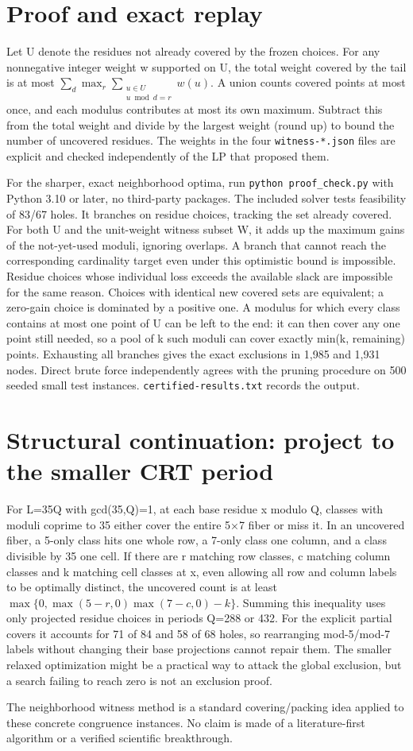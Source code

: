 \documentclass[11pt]{article}
\begin{document}
\section{Proof and exact replay}\label{proof-and-exact-replay}

Let U denote the residues not already covered by the frozen choices. For any nonnegative integer weight w supported on U, the total weight covered by the tail is at most
\(\sum_d \max_r \sum_{\substack{u\in U\\u\bmod d=r}} w(u)\).
A union counts covered points at most once, and each modulus contributes at most its own maximum. Subtract this from the total weight and divide by the largest weight (round up) to bound the number of uncovered residues. The weights in the four \texttt{witness-*.json} files are explicit and checked independently of the LP that proposed them.

For the sharper, exact neighborhood optima, run \texttt{python\ proof\_check.py} with Python 3.10 or later, no third-party packages. The included solver tests feasibility of 83/67 holes. It branches on residue choices, tracking the set already covered. For both U and the unit-weight witness subset W, it adds up the maximum gains of the not-yet-used moduli, ignoring overlaps. A branch that cannot reach the corresponding cardinality target even under this optimistic bound is impossible. Residue choices whose individual loss exceeds the available slack are impossible for the same reason. Choices with identical new covered sets are equivalent; a zero-gain choice is dominated by a positive one. A modulus for which every class contains at most one point of U can be left to the end: it can then cover any one point still needed, so a pool of k such moduli can cover exactly min(k, remaining) points. Exhausting all branches gives the exact exclusions in 1,985 and 1,931 nodes. Direct brute force independently agrees with the pruning procedure on 500 seeded small test instances. \texttt{certified-results.txt} records the output.

\section{Structural continuation: project to the smaller CRT period}\label{structural-continuation-project-to-the-smaller-crt-period}

For L=35Q with gcd(35,Q)=1, at each base residue x modulo Q, classes with moduli coprime to 35 either cover the entire 5×7 fiber or miss it. In an uncovered fiber, a 5-only class hits one whole row, a 7-only class one column, and a class divisible by 35 one cell. If there are r matching row classes, c matching column classes and k matching cell classes at x, even allowing all row and column labels to be optimally distinct, the uncovered count is at least \(\max\{0,\max(5-r,0)\max(7-c,0)-k\}\). Summing this inequality uses only projected residue choices in periods Q=288 or 432. For the explicit partial covers it accounts for 71 of 84 and 58 of 68 holes, so rearranging mod-5/mod-7 labels without changing their base projections cannot repair them. The smaller relaxed optimization might be a practical way to attack the global exclusion, but a search failing to reach zero is not an exclusion proof.

The neighborhood witness method is a standard covering/packing idea applied to these concrete congruence instances. No claim is made of a literature-first algorithm or a verified scientific breakthrough.
\end{document}
